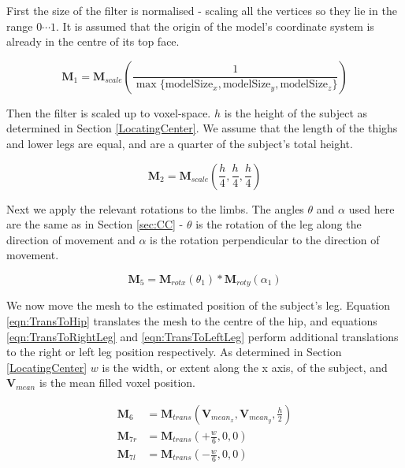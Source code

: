 \bigskip
First the size of the filter is normalised - scaling all the vertices so they lie in the range ${0 \cdots 1}$.
It is assumed that the origin of the model's coordinate system is already in the centre of its top face.

\begin{equation}
	\mathbf{M}_{1} = \mathbf{M}_{scale}(\frac{1}{\max \{\text{modelSize}_{x}, \text{modelSize}_{y}, \text{modelSize}_{z} \}})
\end{equation}

Then the filter is scaled up to voxel-space.
$h$ is the height of the subject as determined in Section \ref{LocatingCenter}.
We assume that the length of the thighs and lower legs are equal, and are a quarter of the subject's total height.

\begin{equation}
	\mathbf{M}_{2} = \mathbf{M}_{scale}(\frac{h}{4}, \frac{h}{4}, \frac{h}{4})
\end{equation}

Next we apply the relevant rotations to the limbs.
The angles $\theta$ and $\alpha$ used here are the same as in Section \ref{sec:CC} -
$\theta$ is the rotation of the leg along the direction of movement and $\alpha$ is the rotation perpendicular to the direction of movement.

\begin{equation}
	\mathbf{M}_{5} = \mathbf{M}_{rotx}(\theta_{1}) * \mathbf{M}_{roty}(\alpha_{1})
\end{equation}

We now move the mesh to the estimated position of the subject's leg.
Equation \ref{eqn:TransToHip} translates the mesh to the centre of the hip, and equations \ref{eqn:TransToRightLeg} and \ref{eqn:TransToLeftLeg} perform additional
translations to the right or left leg position respectively.
As determined in Section \ref{LocatingCenter} $w$ is the width, or extent along the x axis, of the subject,
and $\mathbf{V}_{mean}$ is the mean filled voxel position.

\begin{align}
	\label{eqn:TransToHip}      \mathbf{M}_{6}  &= \mathbf{M}_{trans}(\mathbf{V}_{mean_{x}}, \mathbf{V}_{mean_{y}}, \frac{h}{2}) \\
	\label{eqn:TransToRightLeg} \mathbf{M}_{7r} &= \mathbf{M}_{trans}(+\frac{w}{6}, 0, 0) \\
	\label{eqn:TransToLeftLeg}  \mathbf{M}_{7l} &= \mathbf{M}_{trans}(-\frac{w}{6}, 0, 0)
\end{align}

